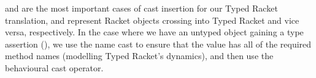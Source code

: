 \documentclass[a4paper,USenglish]{tex/lipics-v2016}
\begin{document}
\begin{mathpar}



\end{mathpar}

\begin{mathpar}



\end{mathpar}

 and  are the most important cases of cast 
insertion for our Typed Racket translation, and represent Racket objects 
crossing into Typed Racket and vice versa, respectively. In the case where we 
have an untyped object gaining a type assertion (), we use the
name cast to ensure that the value has all of the required method names 
(modelling Typed Racket's dynamics), and then use the behavioural cast operator.


\begin{mathpar}

\end{mathpar}
\end{document}
